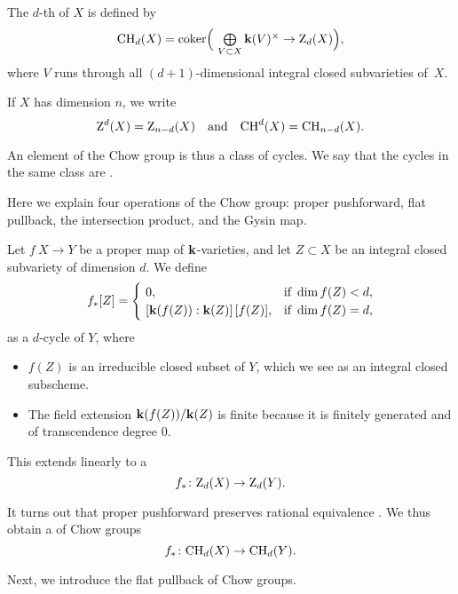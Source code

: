 \begin{definition}
    The $d$-th  of $X$ is defined by
    \[ \textstyle \CH_d (X) = \operatorname{coker} \Bigl( \ 
        \bigoplus \limits _{V \subset X} \bbk (V)^\times \to \upZ_d (X) \Bigr), \]
    where $V$ runs through all $(d+1)$-dimensional integral closed subvarieties of~$X$.

    If $X$ has dimension $n$, we write
    \[ \mathrm{Z}^d (X) = \mathrm{Z}_{n-d} (X) \quad \text{and} \quad \mathrm{CH}^d (X) = \mathrm{CH}_{n-d} (X). \]
\end{definition}

An element of the Chow group is thus a class of cycles.
We say that the cycles in the same class are .

Here we explain four operations of the Chow group:
proper pushforward, flat pullback, the intersection product, and the Gysin map.

\begin{definition}
    Let $f \: X \to Y$ be a proper map of $\bbk$-varieties,
    and let $Z \subset X$ be an integral closed subvariety of dimension $d$.
    We define 
    \[ f_* [Z] = \begin{cases}
        \ 0, & \text{if } \dim f(Z) < d, \\
        \ [\bbk(f(Z)) : \bbk(Z)] \, [f(Z)], & \text{if } \dim f(Z) = d,
    \end{cases} \]
    as a $d$-cycle of $Y$, where
    \begin{itemize}
        \item
            $f(Z)$ is an irreducible closed subset of $Y$,
            which we see as an integral closed subscheme. 
        \item
            The field extension $\bbk(f(Z)) / \bbk(Z)$ is finite
            because it is finitely generated and of transcendence degree $0$.
    \end{itemize}
    This extends linearly to a 
    \[ f_* \colon \mathrm{Z}_d (X) \to \mathrm{Z}_d (Y). \]
\end{definition}

It turns out that proper pushforward preserves rational equivalence \cite[\S1.4]{fulton}.
We thus obtain a \term{pushforward map} of Chow groups
\[ f_* \colon \mathrm{CH}_d (X) \to \mathrm{CH}_d (Y). \]

Next, we introduce the flat pullback of Chow groups.

